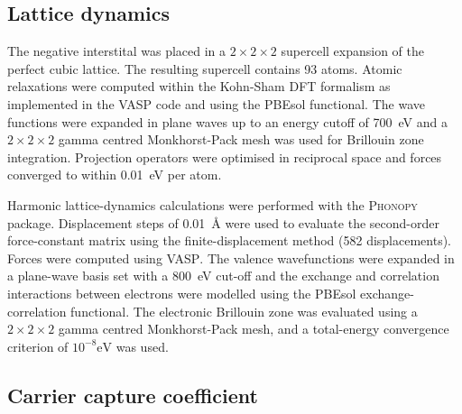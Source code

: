 
\subsection{Lattice dynamics}

The negative interstital was placed in a $2\! \times\! 2\! \times\! 2$ supercell expansion of the perfect cubic lattice. The resulting supercell contains 93 atoms. Atomic relaxations were computed within the Kohn-Sham DFT formalism as implemented in the \textsc{VASP} code\autocite{Kresse1996a} and using the PBEsol functional. The wave functions were expanded in plane waves up to an energy cutoff of \SI{700}{\electronvolt} and a $2\! \times\! 2\! \times\! 2$ gamma centred Monkhorst-Pack mesh was used for Brillouin zone integration.  Projection operators were optimised in reciprocal space and forces converged to within \SI{0.01}{eV} per atom.

Harmonic lattice-dynamics calculations were performed with the \textsc{Phonopy} package.\autocite{Togo2015}
Displacement steps of \SI{0.01}{\angstrom} were used to evaluate the second-order force-constant matrix using the finite-displacement method (582 displacements).
Forces were computed using \textsc{VASP}.
The valence wavefunctions were expanded in a plane-wave basis set with a \SI{800}{\electronvolt} cut-off and the exchange and correlation interactions between electrons were modelled using the PBEsol exchange-correlation functional.\autocite{Perdew2008a}
The electronic Brillouin zone was evaluated using a $2\! \times\! 2\! \times\! 2$ gamma centred Monkhorst-Pack mesh, and a total-energy convergence criterion of $10^{-8}\textrm{eV}$ was used.

\subsection{Carrier capture coefficient}

